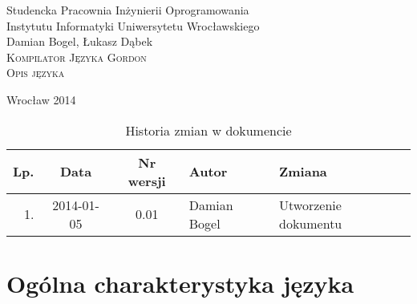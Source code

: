 \documentclass{documentation}
\begin{document}
\begin{titlepage}
\begin{center}
Studencka Pracownia Inżynierii Oprogramowania\\
Instytutu Informatyki Uniwersytetu Wrocławskiego\\[6cm]

Damian Bogel, Łukasz Dąbek\\[1cm]
\textsc{\LARGE Kompilator Języka Gordon}\\[0.5cm]
\textsc{\large Opis języka}

\vfill
Wrocław 2014 \\[2.5cm]

\end{center}
\end{titlepage}

\newpage
\begin{table}
	\centering
    \captionsetup{name=Tabela}
	\caption{Historia zmian w dokumencie}
		\begin{tabular}{|r|c|c|l|l|}
		\hline
		Lp.  & Data       & Nr wersji & Autor                 & Zmiana \\ \hline
		1.   & 2014-01-05 & 0.01 & Damian Bogel & Utworzenie dokumentu \\ \hline
	\end{tabular}
\end{table}
\newpage

\tableofcontents
\setcounter{page}{2}

\newpage

\section{Ogólna charakterystyka języka}
\end{document}
